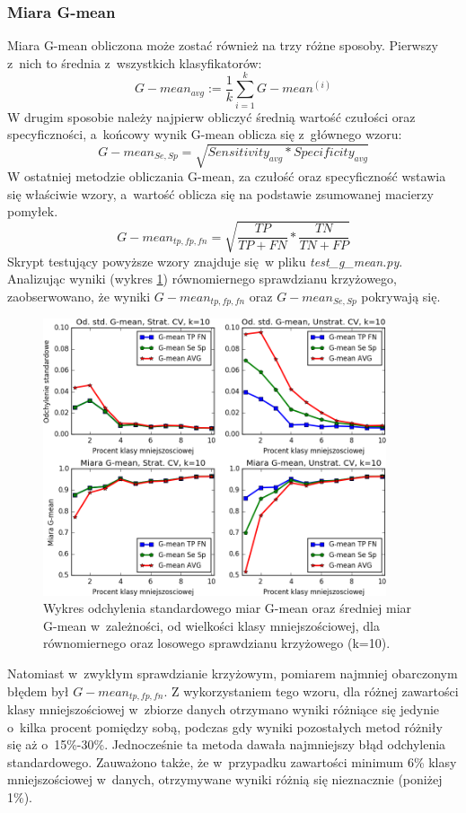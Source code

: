 \subsubsection{Miara G-mean}
Miara G-mean obliczona może zostać również na trzy różne sposoby. Pierwszy z~nich to średnia z~wszystkich klasyfikatorów:
\[G-mean_{avg} := \frac{1}{k} \sum_{i=1}^{k} G-mean^{(i)} \]
W drugim sposobie należy najpierw obliczyć średnią wartość czułości oraz specyficzności, a~końcowy wynik G-mean oblicza się z~głównego wzoru:
\[G-mean_{Se, Sp} = \sqrt{Sensitivity_{avg}*Specificity_{avg}} \]
W ostatniej metodzie obliczania G-mean, za czułość oraz specyficzność wstawia się właściwie wzory, a~wartość oblicza się na podstawie zsumowanej macierzy pomyłek.
\[G-mean_{tp, fp, fn} = \sqrt{\frac{TP}{TP + FN}*\frac{TN}{TN + FP}} \]
Skrypt testujący powyższe wzory znajduje się w pliku \textit{test\_g\_mean.py}. Analizując wyniki (wykres \ref{fig:wykresgmean}) równomiernego sprawdzianu krzyżowego, zaobserwowano, że  wyniki $G-mean_{tp, fp, fn}$ oraz $G-mean_{Se, Sp}$ pokrywają się.
\begin{figure}[H]
	\centering
	\includegraphics[width=0.9\textwidth]{./images/miara-G-mean.png}
	\caption[Odchylenie standardowe oraz średnia miar G-mean dla sprawdzianu krzyżowego]{Wykres odchylenia standardowego miar G-mean oraz średniej miar G-mean w~zależności, od wielkości klasy mniejszościowej, dla równomiernego oraz losowego sprawdzianu krzyżowego (k=10).}
	\label{fig:wykresgmean}
\end{figure}
Natomiast w~zwykłym sprawdzianie krzyżowym, pomiarem najmniej obarczonym błędem był $G-mean_{tp, fp, fn}$. Z wykorzystaniem tego wzoru, dla różnej zawartości klasy mniejszościowej w~zbiorze danych otrzymano wyniki różniące się jedynie o~kilka procent pomiędzy sobą, podczas gdy wyniki pozostałych metod różniły się aż o~15\%-30\%. Jednocześnie ta metoda dawała najmniejszy błąd odchylenia standardowego. Zauważono także, że w~przypadku zawartości minimum 6\% klasy mniejszościowej w~danych, otrzymywane wyniki różnią się nieznacznie (poniżej 1\%).

